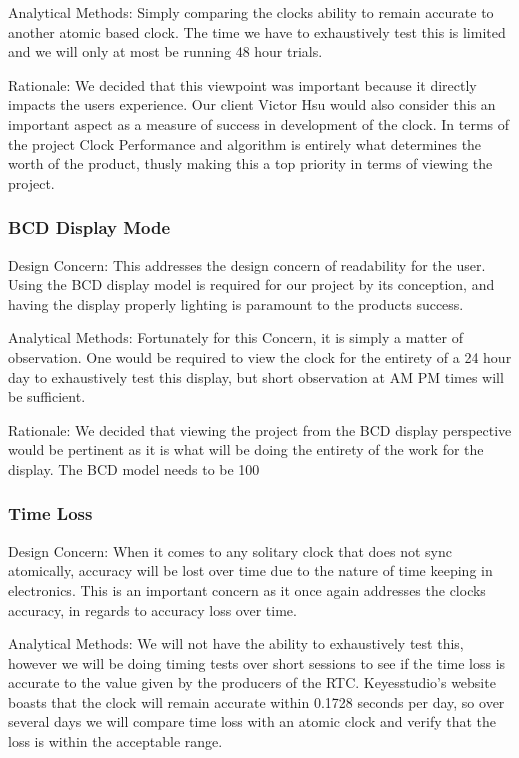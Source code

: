 \documentclass[10pt,draftclsnofoot,onecolumn]{IEEEtran}
\begin{document}
\hfill \break \indent Analytical Methods: Simply comparing the clocks ability to remain accurate to another atomic based clock.
The time we have to exhaustively test this is limited and we will only at most be running 48 hour trials.

\hfill \break \indent Rationale: We decided that this viewpoint was important because it directly impacts the users experience.
Our client Victor Hsu would also consider this an important aspect as a measure of success in development of the clock.
In terms of the project Clock Performance and algorithm is entirely what determines the worth of the product, thusly making this a top priority in terms of viewing the project.

\subsubsection{BCD Display Mode}
\hfill \break \indent Design Concern: This addresses the design concern of readability for the user.
Using the BCD display model is required for our project by its conception, and having the display properly lighting is paramount to the products success.

\hfill \break \indent Analytical Methods: Fortunately for this Concern, it is simply a matter of observation.
One would be required to view the clock for the entirety of a 24 hour day to exhaustively test this display, but short observation at AM PM times will be sufficient.

\hfill \break \indent Rationale: We decided that viewing the project from the BCD display perspective would be pertinent as it is what will be doing the entirety of the work for the display.
The BCD model needs to be 100%

\subsubsection{Time Loss}
\hfill \break \indent Design Concern: When it comes to any solitary clock that does not sync atomically, accuracy will be lost over time due to the nature of time keeping in electronics.
This is an important concern as it once again addresses the clocks accuracy, in regards to accuracy loss over time.

\hfill \break \indent Analytical Methods: We will not have the ability to exhaustively test this, however we will be doing timing tests over short sessions to see if the time loss is accurate to the value given by the producers of the RTC.
Keyesstudio's website boasts that the clock will remain accurate within 0.1728 seconds per day, so over several days we will compare time loss with an atomic clock  and verify that the loss is within the acceptable range.
\end{document}
